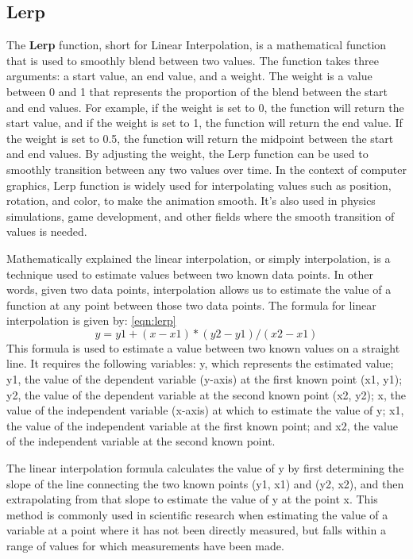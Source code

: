 \subsection{Lerp}
\label{sec:lerp}
The \textbf{Lerp} function, short for Linear Interpolation, is a mathematical function that is 
used to smoothly blend between two values. The function takes three arguments: a start value, 
an end value, and a weight. The weight is a value between 0 and 1 that represents the proportion 
of the blend between the start and end values.
For example, if the weight is set to 0, the function will return the start 
value, and if the weight is set to 1, the function will return the end value. 
If the weight is set to 0.5, the function will return the midpoint between the 
start and end values. By adjusting the weight, the Lerp function can be used to 
smoothly transition between any two values over time.
In the context of computer graphics, Lerp function is widely used for 
interpolating values such as position, rotation, and color, to make the 
animation smooth. It's also used in physics simulations, game development, 
and other fields where the smooth transition of values is needed.

Mathematically explained the linear interpolation, or simply interpolation, 
is a technique used to estimate values between two known data points. In other words, given two data points, 
interpolation allows us to estimate the value of a function at any point between those two data points.
The formula for linear interpolation is given by: \ref{eqn:lerp}
\begin{equation}
  \label{eqn:lerp}
	y = y1 + (x - x1) * (y2 - y1) / (x2 - x1)
\end{equation}
This formula is used to estimate a value between two known values on a straight line. It requires the following variables: y, 
which represents the estimated value; y1, the value of the dependent variable (y-axis) at the first known point (x1, y1); y2, 
the value of the dependent variable at the second known point (x2, y2); x, the value of the independent variable (x-axis) 
at which to estimate the value of y; x1, the value of the independent variable at the first known point; and x2, the value 
of the independent variable at the second known point.

The linear interpolation formula calculates the value of y by first determining the slope of the line connecting the two 
known points (y1, x1) and (y2, x2), and then extrapolating from that slope to estimate the value of y at the point x. 
This method is commonly used in scientific research when estimating the value of a variable at a point where it has not 
been directly measured, but falls within a range of values for which measurements have been made.

